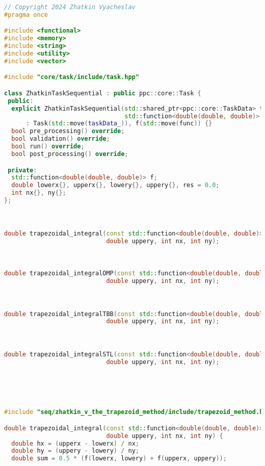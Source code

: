 \documentclass[]{article}
\theoremstyle{remark}
\theoremstyle{definition}
\begin{document}
\begin{lstlisting}[language=C++]
// Copyright 2024 Zhatkin Vyacheslav
#pragma once

#include <functional>
#include <memory>
#include <string>
#include <utility>
#include <vector>

#include "core/task/include/task.hpp"

class ZhatkinTaskSequential : public ppc::core::Task {
 public:
  explicit ZhatkinTaskSequential(std::shared_ptr<ppc::core::TaskData> taskData_,
                                 std::function<double(double, double)> func)
      : Task(std::move(taskData_)), f(std::move(func)) {}
  bool pre_processing() override;
  bool validation() override;
  bool run() override;
  bool post_processing() override;

 private:
  std::function<double(double, double)> f;
  double lowerx{}, upperx{}, lowery{}, uppery{}, res = 0.0;
  int nx{}, ny{};
};



double trapezoidal_integral(const std::function<double(double, double)>& f, double lowerx, double upperx, double lowery,
                            double uppery, int nx, int ny);

                            

double trapezoidal_integralOMP(const std::function<double(double, double)>& f, double lowerx, double upperx, double lowery,
                            double uppery, int nx, int ny);



double trapezoidal_integralTBB(const std::function<double(double, double)>& f, double lowerx, double upperx, double lowery,
                            double uppery, int nx, int ny);



double trapezoidal_integralSTL(const std::function<double(double, double)>& f, double lowerx, double upperx, double lowery,
                            double uppery, int nx, int ny);





#include "seq/zhatkin_v_the_trapezoid_method/include/trapezoid_method.hpp"

double trapezoidal_integral(const std::function<double(double, double)>& f, double lowerx, double upperx, double lowery,
                            double uppery, int nx, int ny) {
  double hx = (upperx - lowerx) / nx;
  double hy = (uppery - lowery) / ny;
  double sum = 0.5 * (f(lowerx, lowery) + f(upperx, uppery));


\end{lstlisting}
\end{document}
